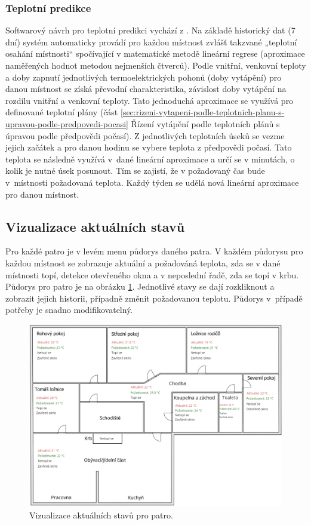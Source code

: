 \subsubsection{Teplotní predikce}
\label{sec:teplotni-predikce}
Softwarový návrh pro teplotní predikci vychází z \cite{teplotni-predikce}. Na základě historický dat (7 dní) systém automaticky provádí pro každou místnost zvlášť takzvané „teplotní osahání místnosti“ spočívající v matematické metodě lineární regrese (aproximace naměřených hodnot metodou nejmenších čtverců). Podle vnitřní, venkovní teploty a doby zapnutí jednotlivých termoelektrických pohonů (doby vytápění) pro danou místnost se získá převodní charakteristika, závislost doby vytápění na rozdílu vnitřní a venkovní teploty. Tato jednoduchá aproximace se využívá pro definované teplotní plány (část \ref{sec:rizeni-vytapeni-podle-teplotnich-planu-s-upravou-podle-predpovedi-pocasi} Řízení vytápění podle teplotních plánů s úpravou podle předpovědi počasí). Z jednotlivých teplotních úseků se vezme jejich začátek a pro danou hodinu se vybere teplota z předpovědi počasí. Tato teplota se následně využívá v~dané lineární aproximace a určí se v minutách, o kolik je nutné úsek posunout. Tím se zajistí, že v požadovaný čas bude v~místnosti požadovaná teplota. Každý týden se udělá nová lineární aproximace pro danou místnost.

\subsection{Vizualizace aktuálních stavů}
Pro každé patro je v levém menu půdorys daného patra. V každém půdorysu pro každou místnost se zobrazuje aktuální a požadováná teplota, zda se v dané místnosti topí, detekce otevřeného okna a v neposlední řadě, zda se topí v krbu. Půdorys pro patro je na obrázku \ref{fig:vizualizace-hodnot-patro-pudorys}. Jednotlivé stavy se dají rozkliknout a zobrazit jejich historii, případně změnit požadovanou teplotu. Půdorys v~případě potřeby je snadno modifikovatelný.

\begin{figure}[H]
    \centering
    \includegraphics[width=\textwidth]{images/software-ha/vizualizace-hodnot-patro-pudorys.png}
    \caption{Vizualizace aktuálních stavů pro patro.}
    \label{fig:vizualizace-hodnot-patro-pudorys}
\end{figure}


